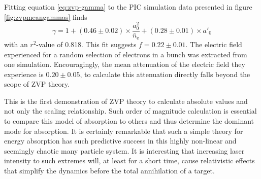 Fitting equation \ref{eq:zvp-gamma} to the PIC simulation data presented in figure \ref{fig:zvpmeangammas} finds
\begin{equation}
	\gamma = 1 + (0.46\pm 0.02)\times \frac{a^2_0}{\bar{n}_\mathrm{e}} + (0.28\pm 0.01)\times a'_0
\end{equation}
with an $r^2$-value of 0.818. This fit suggests $f = 0.22\pm 0.01$. The electric field experienced for a random selection of electrons in a bunch was extracted from one simulation. Encouragingly, the mean attenuation of the electric field they experience is $0.20\pm0.05$, to calculate this attenuation directly falls beyond the scope of ZVP theory.

This is the first demonstration of ZVP theory to calculate absolute values and not only the scaling relationship. Such order of magnitude calculation is essential to compare this model of absorption to others and thus determine the dominant mode for absorption. It is certainly remarkable that such a simple theory for energy absorption has such predictive success in this highly non-linear and seemingly chaotic many particle system. It is interesting that increasing laser intensity to such extremes will, at least for a short time, cause relativistic effects that simplify the dynamics before the total annihilation of a target.

